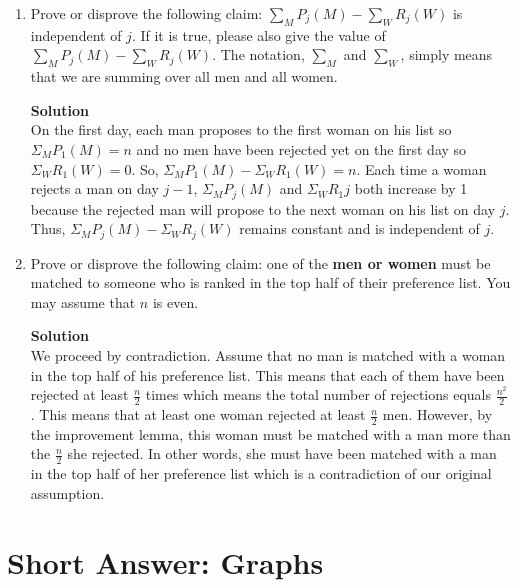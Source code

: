 \documentclass[11pt]{article}
\newcommand*{\Question}[1]{\section{#1}}
\newenvironment{Parts}{\begin{enumerate}[label=(\alph*)]}{\end{enumerate}}
\newcommand*{\Part}{\item}
\newenvironment{Answer}{\vspace{10pt}\begin{mdframed}\textbf{Solution}\\}{\end{mdframed}\vfill\pagebreak[3]}
\newenvironment{Answer}{\vspace{10pt}}{\vfill\pagebreak[3]}
\begin{document}
\begin{Parts}
\Part  Prove or disprove the following claim: $\sum_M P_j(M) - \sum_W R_j(W)$ is independent of $j$. If it is true, please also give the value of $\sum_M P_j(M) - \sum_W R_j(W)$. The notation, $\sum_M$ and $\sum_W$, simply means that we are summing over all men and all women.

\begin{Answer}
On the first day, each man proposes to the first woman on his list so $\Sigma_MP_1(M)=n$ and no men have been rejected yet on the first day so $\Sigma_WR_1(W)=0$. So,  $\Sigma_MP_1(M)-\Sigma_WR_1(W)=n$. Each time a woman rejects a man on day $j-1$, $\Sigma_MP_j(M)$ and $\Sigma_WR_1j$ both increase by 1 because the rejected man will propose to the next woman on his list on day $j$. Thus,  $\Sigma_MP_j(M)-\Sigma_WR_j(W)$ remains constant and is independent of $j$.
\end{Answer}

\Part  Prove or disprove the following claim: one of the \textbf{men or women} must be matched to someone who is ranked in the top half of their preference list. You may assume that $n$ is even. 

\begin{Answer}
We proceed by contradiction. Assume that no man is matched with a woman in the top half of his preference list. This means that each of them have been rejected at least $\frac{n}{2}$ times which means the total number of rejections equals $\frac{n^2}{2}$. This means that at least one woman rejected at least $\frac{n}{2}$ men. However, by the improvement lemma, this woman must be matched with a man more than the $\frac{n}{2}$ she rejected. In other words, she must have been matched with a man in the top half of her preference list which is a contradiction of our original assumption.
\end{Answer}

\end{Parts}




\Question{Short Answer: Graphs}
\end{document}
